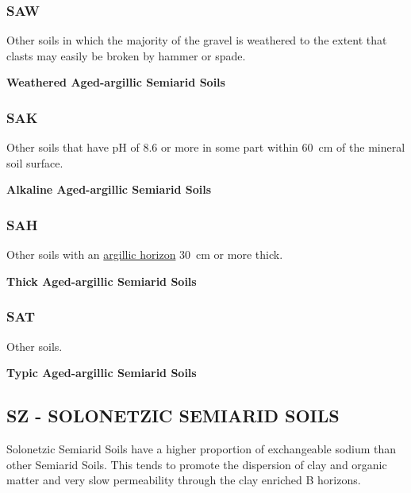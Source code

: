 \documentclass[
  letterpaper,
  DIV=11,
  numbers=noendperiod]{scrreprt}
\begin{document}
\hypertarget{sec-key-SAW}{%
\subsubsection{\texorpdfstring{\textbf{SAW}}{SAW}}\label{sec-key-SAW}}

Other soils in which the majority of the gravel is weathered to the
extent that clasts may easily be broken by hammer or spade.

\textbf{Weathered Aged-argillic Semiarid Soils}

\hypertarget{sec-key-SAK}{%
\subsubsection{\texorpdfstring{\textbf{SAK}}{SAK}}\label{sec-key-SAK}}

Other soils that have pH of 8.6 or more in some part within 60~cm of the
mineral soil surface.

\textbf{Alkaline Aged-argillic Semiarid Soils}

\hypertarget{sec-key-SAH}{%
\subsubsection{\texorpdfstring{\textbf{SAH}}{SAH}}\label{sec-key-SAH}}

Other soils with an \protect\hyperlink{sec-diag-argh}{argillic horizon}
30~cm or more thick.

\textbf{Thick Aged-argillic Semiarid Soils}

\hypertarget{sec-key-SAT}{%
\subsubsection{\texorpdfstring{\textbf{SAT}}{SAT}}\label{sec-key-SAT}}

Other soils.

\textbf{Typic Aged-argillic Semiarid Soils}

\hypertarget{sec-SZ}{%
\subsection{\texorpdfstring{\textbf{SZ} - SOLONETZIC SEMIARID
SOILS}{SZ - SOLONETZIC SEMIARID SOILS}}\label{sec-SZ}}

Solonetzic Semiarid Soils have a higher proportion of exchangeable
sodium than other Semiarid Soils. This tends to promote the dispersion
of clay and organic matter and very slow permeability through the clay
enriched B horizons.
\end{document}
